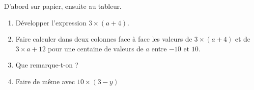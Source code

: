 
\begin{exercice}\label{exo2smath-0210}

    D'abord sur papier, ensuite au tableur.

    \begin{enumerate}
        \item
            Développer l'expression \( 3\times (a+4)\).
        \item
            Faire calculer dans deux colonnes face à face les valeurs de \( 3\times (a+4)\) et de \( 3\times a+12\) pour une centaine de valeurs de \( a\) entre \( -10\) et \( 10\).
        \item
            Que remarque-t-on ?
        \item
            Faire de même avec \( 10\times (3-y)\)
    \end{enumerate}

\end{exercice}
